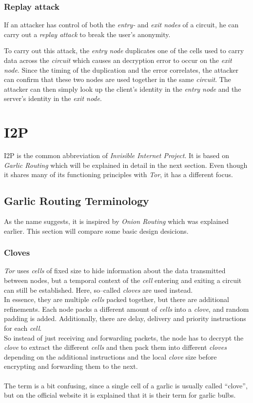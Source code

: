\documentclass{sig-alternate}
\begin{document}
\subsubsection{Replay attack}
If an attacker has control of both the \emph{entry-} and \emph{exit nodes} of a circuit, he
can carry out a \emph{replay attack}\cite{pries2007} to break the user's anonymity.

To carry out this attack, the \emph{entry node} duplicates one of the cells used to carry data
across the \emph{circuit} which causes an decryption error to occur on the \emph{exit node}.
Since the timing of the duplication and the error correlates, the attacker can confirm that
these two nodes are used together in the same \emph{circuit}. The attacker can then simply
look up the client's identity in the \emph{entry node} and the server's identity in the
\emph{exit node}.

\section{I2P}
I2P is the common abbreviation of \emph{Invisible Internet Project}.
It is based on \emph{Garlic Routing} which will be explained in detail in the next section.
Even though it shares many of its functioning principles with \emph{Tor}, it has a different focus.

\subsection{Garlic Routing Terminology}
As the name suggests, it is inspired by \emph{Onion Routing} which was explained earlier.
This section will compare some basic design desicions.

\subsubsection{Cloves}
\emph{Tor} uses \emph{cells} of fixed size to hide information about the data transmitted between nodes, but a temporal context of the \emph{cell} entering and exiting a circuit can still be established.
Here, so--called \emph{cloves} are used instead.
\\
In essence, they are multiple \emph{cells} packed together, but there are additional refinements.
Each node packs a different amount of \emph{cells} into a \emph{clove}, and random padding is added.
Additionally, there are delay, delivery and priority instructions for each \emph{cell}.
\\
So instead of just receiving and forwarding packets, the node has to decrypt the \emph{clove} to extract the different \emph{cells} and then pack them into different \emph{cloves} depending on the additional instructions and the local \emph{clove} size before encrypting and forwarding them to the next\cite{zantout2011}.
\\
\\
The term is a bit confusing, since a single cell of a garlic is usually called ``clove'', but on the official website it is explained that it is their term for garlic bulbs\cite{garlic}.
\end{document}
